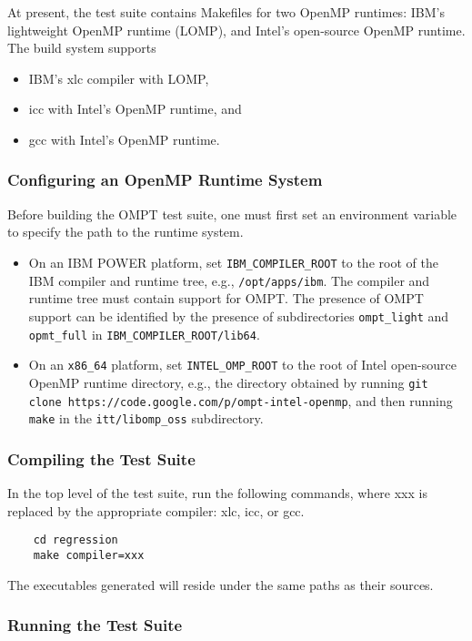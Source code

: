 \documentclass{article}
\begin{document}
At present, the test suite contains Makefiles for two OpenMP runtimes: IBM's lightweight OpenMP runtime (LOMP), and Intel's open-source OpenMP runtime. The build system supports 
\begin{itemize}
\item IBM's xlc compiler with LOMP,
\item icc with Intel's OpenMP runtime, and
\item gcc with Intel's OpenMP runtime.
\end{itemize}

\subsubsection{Configuring an OpenMP Runtime System}
Before building the OMPT test suite, one must first set an environment variable to specify the path to the runtime system.
\begin{itemize}
\item On an IBM POWER platform, set \verb|IBM_COMPILER_ROOT| to the root of the IBM compiler and runtime tree, e.g., {\tt /opt/apps/ibm}. The compiler and runtime tree must contain support for OMPT. The presence of OMPT support can be identified by the presence of subdirectories \verb|ompt_light| and \verb|opmt_full| in \verb|IBM_COMPILER_ROOT/lib64|.
\item On an \verb|x86_64| platform, set \verb|INTEL_OMP_ROOT| to the root of Intel open-source OpenMP runtime directory, e.g., the directory obtained by running {\tt  git clone https://code.google.com/p/ompt-intel-openmp}, and then running \verb|make| in the  \verb|itt/libomp_oss| subdirectory.
\end{itemize}
\subsubsection{Compiling the Test Suite}
In the top level of the test suite, run the following commands, where xxx is replaced by the appropriate compiler: xlc, icc, or gcc.
    \begin{verbatim}
    cd regression
    make compiler=xxx       
    \end{verbatim}
\noindent The executables generated will reside under the same paths as their sources.
    
\subsubsection{Running the Test Suite}
    
\end{document}
